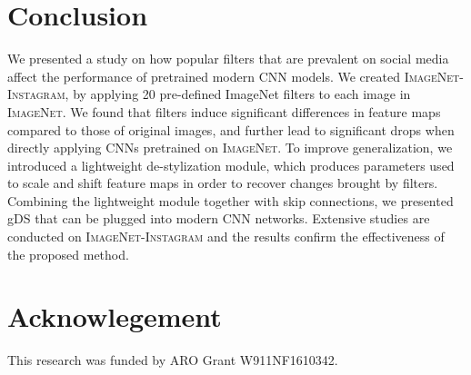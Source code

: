 \documentclass[letterpaper]{article} %
\newcommand{\instagram}{{\scshape ImageNet-Instagram}\xspace}
\newcommand{\imagenet}{{\scshape ImageNet}\xspace}
\newcommand{\gsystem}{gDS\xspace}
\begin{document}



\section{Conclusion}
We presented a study on how popular filters that are prevalent on social media affect the performance of pretrained modern CNN models. We created \instagram, by applying 20 pre-defined ImageNet filters to each image in \imagenet. We found that filters induce significant differences in feature maps compared to those of original images, and further lead to significant drops when directly applying CNNs pretrained on \imagenet. To improve generalization, we introduced a lightweight de-stylization module, which produces parameters used to scale and shift feature maps in order to recover changes brought by filters. Combining the lightweight module together with skip connections, we presented \gsystem that can be plugged into modern CNN networks. Extensive studies are conducted on \instagram and the results confirm the effectiveness of the proposed method.

\section{Acknowlegement}
This research was funded by ARO Grant W911NF1610342. 



\end{document}
